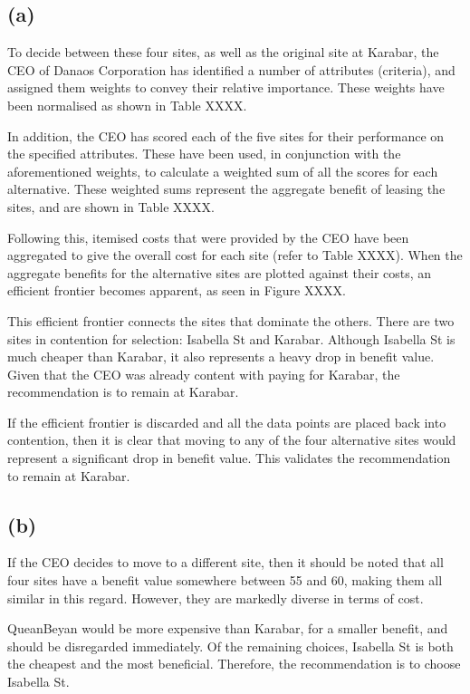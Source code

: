 \documentclass[11pt, a4paper]{article}
\begin{document}
    \subsection*{(a)}

    To decide between these four sites, as well as the original site at Karabar, the CEO of Danaos Corporation has identified a number of attributes (criteria), and assigned them weights to convey their relative importance. These weights have been normalised as shown in Table XXXX.

    In addition, the CEO has scored each of the five sites for their performance on the specified attributes. These have been used, in conjunction with the aforementioned weights, to calculate a weighted sum of all the scores for each alternative. These weighted sums represent the aggregate benefit of leasing the sites, and are shown in Table XXXX.

    Following this, itemised costs that were provided by the CEO have been aggregated to give the overall cost for each site (refer to Table XXXX). When the aggregate benefits for the alternative sites are plotted against their costs, an efficient frontier becomes apparent, as seen in Figure XXXX.

    This efficient frontier connects the sites that dominate the others. There are two sites in contention for selection: Isabella St and Karabar. Although Isabella St is much cheaper than Karabar, it also represents a heavy drop in benefit value. Given that the CEO was already content with paying for Karabar, the recommendation is to remain at Karabar.

    If the efficient frontier is discarded and all the data points are placed back into contention, then it is clear that moving to any of the four alternative sites would represent a significant drop in benefit value. This validates the recommendation to remain at Karabar.

    \subsection*{(b)}

    If the CEO decides to move to a different site, then it should be noted that all four sites have a benefit value somewhere between 55 and 60, making them all similar in this regard. However, they are markedly diverse in terms of cost.

    QueanBeyan would be more expensive than Karabar, for a smaller benefit, and should be disregarded immediately. Of the remaining choices, Isabella St is both the cheapest and the most beneficial. Therefore, the recommendation is to choose Isabella St.
\end{document}
